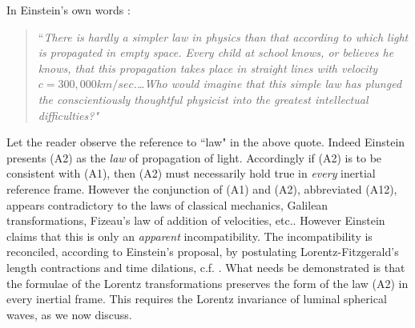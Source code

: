 \documentclass[12pt]{amsart}
\theoremstyle{definition}
\theoremstyle{remark}
\begin{document}
In Einstein's own words \cite[Ch.7, 11]{einstein2019relativity}:

\begin{quote} 
``\emph{There is hardly a simpler law in physics than that according to which light is propagated in empty space. Every child at school knows, or believes he knows, that this propagation takes place in straight lines with velocity $c=300, 000 km/sec$.\ldots Who would imagine that this simple law has plunged the conscientiously thoughtful physicist into the greatest intellectual difficulties?"} 
\end{quote}

Let the reader observe the reference to ``law" in the above quote. Indeed Einstein presents (A2) as the \emph{law} of propagation of light. Accordingly if (A2) is to be consistent with (A1), then (A2) must necessarily hold true in \emph{every} inertial reference frame. However the conjunction of (A1) and (A2), abbreviated (A12), appears contradictory to the laws of classical mechanics, Galilean transformations, Fizeau's law of addition of velocities, etc.. However Einstein claims that this is only an \emph{apparent} incompatibility. The incompatibility is reconciled, according to Einstein's proposal, by postulating Lorentz-Fitzgerald's length contractions and time dilations, c.f. \cite[Ch.XIV]{michelson}. What needs be demonstrated is that the formulae of the Lorentz transformations preserves the form of the law (A2) in every inertial frame. This requires the Lorentz invariance of luminal spherical waves, as we now discuss.






\end{document}
